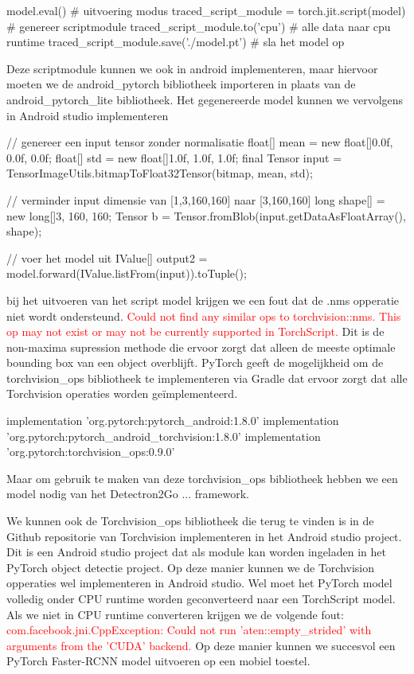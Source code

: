 \begin{python}
model.eval() # uitvoering modus
traced_script_module = torch.jit.script(model) # genereer scriptmodule
traced_script_module.to('cpu') # alle data naar cpu runtime
traced_script_module.save('./model.pt') # sla het model op
\end{python}

Deze scriptmodule kunnen we ook in android implementeren, maar hiervoor moeten we de android\_pytorch bibliotheek importeren in plaats van de android\_pytorch\_lite bibliotheek.
Het gegenereerde model kunnen we vervolgens in Android studio implementeren

\begin{python}
// genereer een input tensor zonder normalisatie
float[] mean = new float[]{0.0f, 0.0f, 0.0f};
float[] std = new float[]{1.0f, 1.0f, 1.0f};
final Tensor input = TensorImageUtils.bitmapToFloat32Tensor(bitmap, mean, std);

// verminder input dimensie van [1,3,160,160] naar [3,160,160]
long shape[] = new long[]{3, 160, 160};
Tensor b = Tensor.fromBlob(input.getDataAsFloatArray(), shape);

// voer het model uit
IValue[] output2 = model.forward(IValue.listFrom(input)).toTuple();
\end{python}

bij het uitvoeren van het script model krijgen we een fout dat de .nms opperatie niet wordt ondersteund.
\textcolor{red}{Could not find any similar ops to torchvision::nms. This op may not exist or may not be currently supported in TorchScript.}
\newline
Dit is de non-maxima supression methode die ervoor zorgt dat alleen de meeste optimale bounding box van een object overblijft. 
PyTorch geeft de mogelijkheid om de torchvision\_ops bibliotheek te implementeren via Gradle dat ervoor zorgt dat alle Torchvision operaties worden ge\"implementeerd.

\begin{python}
implementation 'org.pytorch:pytorch_android:1.8.0'
implementation 'org.pytorch:pytorch_android_torchvision:1.8.0'
implementation 'org.pytorch:torchvision_ops:0.9.0'
\end{python}
Maar om gebruik te maken van deze torchvision\_ops bibliotheek hebben we een model nodig van het Detectron2Go ... framework.

We kunnen ook de Torchvision\_ops bibliotheek die terug te vinden is in de Github repositorie van Torchvision implementeren in het Android studio project.
Dit is een Android studio project dat als module kan worden ingeladen in het PyTorch object detectie project.
Op deze manier kunnen we de Torchvision opperaties wel implementeren in Android studio.
Wel moet het PyTorch model volledig onder CPU runtime worden geconverteerd naar een TorchScript model.
Als we niet in CPU runtime converteren krijgen we de volgende fout: \textcolor{red}{com.facebook.jni.CppException: Could not run 'aten::empty\_strided' with arguments from the 'CUDA' backend.}
\newline
Op deze manier kunnen we succesvol een PyTorch Faster-RCNN model uitvoeren op een mobiel toestel.

